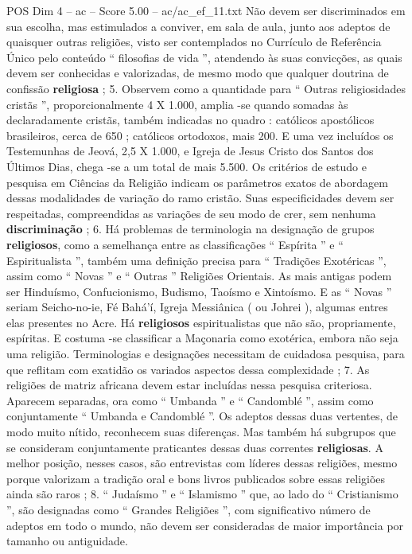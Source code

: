 \begin{textsample}{POS Dim 4 – ac – Score 5.00 – ac/ac\_ef\_11.txt}
Não devem ser discriminados em sua escolha, mas estimulados a conviver, em sala de aula, junto aos adeptos de quaisquer outras religiões, visto ser contemplados no Currículo de Referência Único pelo conteúdo “ filosofias de vida ”, atendendo às suas convicções, as quais devem ser conhecidas e valorizadas, de mesmo modo que qualquer doutrina de confissão \textbf{religiosa} ; 5.
Observem como a quantidade para “ Outras religiosidades cristãs ”, proporcionalmente 4 X 1.000, amplia -se quando somadas às declaradamente cristãs, também indicadas no quadro : católicos apostólicos brasileiros, cerca de 650 ; católicos ortodoxos, mais 200.
E uma vez incluídos os Testemunhas de Jeová, 2,5 X 1.000, e Igreja de Jesus Cristo dos Santos dos Últimos Dias, chega -se a um total de mais 5.500.
Os critérios de estudo e pesquisa em Ciências da Religião indicam os parâmetros exatos de abordagem dessas modalidades de variação do ramo cristão.
Suas especificidades devem ser respeitadas, compreendidas as variações de seu modo de crer, sem nenhuma \textbf{discriminação} ; 6.
Há problemas de terminologia na designação de grupos \textbf{religiosos}, como a semelhança entre as classificações “ Espírita ” e “ Espiritualista ”, também uma definição precisa para “ Tradições Exotéricas ”, assim como “ Novas ” e “ Outras ” Religiões Orientais.
As mais antigas podem ser Hinduísmo, Confucionismo, Budismo, Taoísmo e Xintoísmo.
E as “ Novas ” seriam Seicho-no-ie, Fé Bahá’í, Igreja Messiânica ( ou Johrei ), algumas entres elas presentes no Acre.
Há \textbf{religiosos} espiritualistas que não são, propriamente, espíritas.
E costuma -se classificar a Maçonaria como exotérica, embora não seja uma religião.
Terminologias e designações necessitam de cuidadosa pesquisa, para que reflitam com exatidão os variados aspectos dessa complexidade ; 7.
As religiões de matriz africana devem estar incluídas nessa pesquisa criteriosa.
Aparecem separadas, ora como “ Umbanda ” e “ Candomblé ”, assim como conjuntamente “ Umbanda e Candomblé ”.
Os adeptos dessas duas vertentes, de modo muito nítido, reconhecem suas diferenças.
Mas também há subgrupos que se consideram conjuntamente praticantes dessas duas correntes \textbf{religiosas}.
A melhor posição, nesses casos, são entrevistas com líderes dessas religiões, mesmo porque valorizam a tradição oral e bons livros publicados sobre essas religiões ainda são raros ; 8. “ Judaísmo ” e “ Islamismo ” que, ao lado do “ Cristianismo ”, são designadas como “ Grandes Religiões ”, com significativo número de adeptos em todo o mundo, não devem ser consideradas de maior importância por tamanho ou antiguidade.

\end{textsample}
